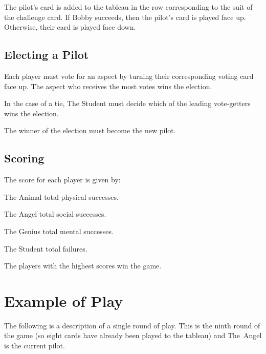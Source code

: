 \documentclass[a4paper, 10pt,notumble]{leaflet}
\begin{document}
The pilot's card is added to the tableau in the row corresponding to the suit of the challenge card. If Bobby succeeds, then the pilot's card is played face up.  Otherwise, their card is played face down. 

\subsection{Electing a Pilot}
Each player must vote for an aspect by turning their corresponding voting card face up.
The aspect who receives the most votes wins the election. 

In the case of a tie, The Student must decide which of the leading vote-getters wins the election. 

The winner of the election must become the new pilot.

\subsection{Scoring}
The score for each player is given by:
\begin{playerlistnarrow}
	\item[The Animal\normalfont{:}] total physical successes.
	\item[The Angel\normalfont{:}] total social successes.
	\item[The Genius\normalfont{:}] total mental successes.
	\item[The Student\normalfont{:}] total failures.
\end{playerlistnarrow}
The players with the highest scores win the game.
\newpage



\section{Example of Play}
The following is a description of a single round of play. This is the ninth round of the game (so eight cards have already been played to the tableau) and The~Angel is the current pilot.
\end{document}
